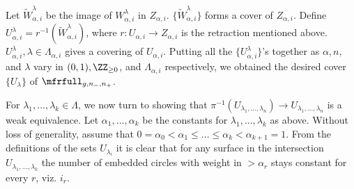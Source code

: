 \documentclass[a4paper,10pt]{amsart}
\begin{document}
Let $\widetilde{W}^{\lambda}_{\alpha,i}$ be the image of $W^{\lambda}_{\alpha,i}$ in $Z_{\alpha,i}$. $\{\widetilde{W}^{\lambda}_{\alpha,i}\}$ forms a cover of $Z_{\alpha,i}$. Define $U_{\alpha,i}^{\lambda} = r^{-1} (\widetilde{W}_{\alpha,i}^{\lambda}) $, where $r \colon U_{\alpha,i} \to Z_{\alpha,i}$ is the retraction mentioned above. $U_{\alpha,i}^{\lambda}, \lambda \in \Lambda_{\alpha,i}$ gives a covering of $U_{\alpha,i}$. Putting all the $\{U_{\alpha,i}^{\lambda}\}$'s together as $\alpha, n ,$ and $\lambda$ vary in $(0,1), \ZZ_{\geq 0}$, and $\Lambda_{\alpha,i}$ respectively, we obtained the desired cover $\{U_{\lambda}\}$ of $\mfrfull_{g,n_-,n_+}$.

 
For $\lambda_1,...,\lambda_k \in \Lambda$, we now turn to showing that $\pi^{-1}(U_{\lambda_1, ..., \lambda_n}) \to U_{\lambda_1, ..., \lambda_n}$ is a weak equivalence. Let $\alpha_1, ... , \alpha_k$ be the constants for $\lambda_1,...,\lambda_k$ as above. Without loss of generality, assume that $0 = \alpha_{0} < \alpha_{1} \leq ... \leq \alpha_{k} < \alpha_{k+1} = 1$. From the definitions of the sets $U_{\lambda_i}$ it is clear that for any surface in the intersection $U_{\lambda_1,...,\lambda_k}$ the number of embedded circles with weight in $>\alpha_r$ stays constant for every $r$, viz. $i_r$.\\ %
\end{document}
